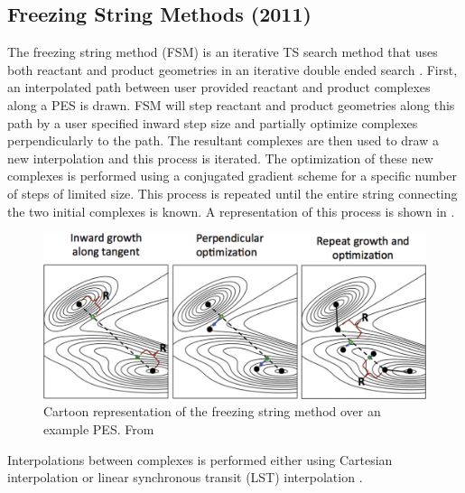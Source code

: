 \documentclass[preprint, 11pt]{elsarticle} %
\begin{document}
\subsection{Freezing String Methods (2011)}

The freezing string method (FSM) is an iterative TS search method that uses both reactant and product geometries in an iterative double ended search \cite{Behn:2011}.
First, an interpolated path between user provided reactant and product complexes along a PES is drawn.
FSM will step reactant and product geometries along this path by a user specified inward step size and partially optimize complexes perpendicularly to the path. 
The resultant complexes are then used to draw a new interpolation and this process is iterated.
The optimization of these new complexes is performed using a conjugated gradient scheme for a specific number of steps of limited size. 
This process is repeated until the entire string connecting the two initial complexes is known. 
A representation of this process is shown in . 

\begin{figure}[htbp]
    \centering
    \includegraphics[width=5in]{fsm}
    \caption{Cartoon representation of the freezing string method over an example PES. From \cite{Behn:2011}}
    \label{fig:fsm}
\end{figure}

Interpolations between complexes is performed either using Cartesian interpolation or linear synchronous transit (LST) interpolation \cite{HALGREN:1977, Peng:1993}. 
\end{document}
